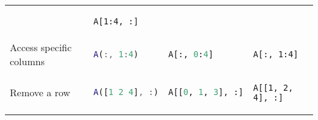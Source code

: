 \begin{tabular}[]{@{}llll@{}}
\begin{minipage}[t]{0.23\columnwidth}
\end{minipage} & \begin{minipage}[t]{0.20\columnwidth}\raggedright
\begin{lstlisting}
A[1:4, :]
\end{lstlisting}

\end{minipage}\tabularnewline
\begin{minipage}[t]{0.23\columnwidth}\raggedright
Access specific columns
\end{minipage} & \begin{minipage}[t]{0.23\columnwidth}\raggedright
\begin{lstlisting}[language=Matlab]
A(:, 1:4)
\end{lstlisting}

\end{minipage} & \begin{minipage}[t]{0.23\columnwidth}\raggedright
\begin{lstlisting}[language=Python]
A[:, 0:4]
\end{lstlisting}

\end{minipage} & \begin{minipage}[t]{0.20\columnwidth}\raggedright
\begin{lstlisting}
A[:, 1:4]
\end{lstlisting}

\end{minipage}\tabularnewline
\begin{minipage}[t]{0.23\columnwidth}\raggedright
Remove a row
\end{minipage} & \begin{minipage}[t]{0.23\columnwidth}\raggedright
\begin{lstlisting}[language=Matlab]
A([1 2 4], :)
\end{lstlisting}

\end{minipage} & \begin{minipage}[t]{0.23\columnwidth}\raggedright
\begin{lstlisting}[language=Python]
A[[0, 1, 3], :]
\end{lstlisting}

\end{minipage} & \begin{minipage}[t]{0.20\columnwidth}\raggedright
\begin{lstlisting}
A[[1, 2, 4], :]
\end{lstlisting}


\end{minipage}
\end{tabular}
